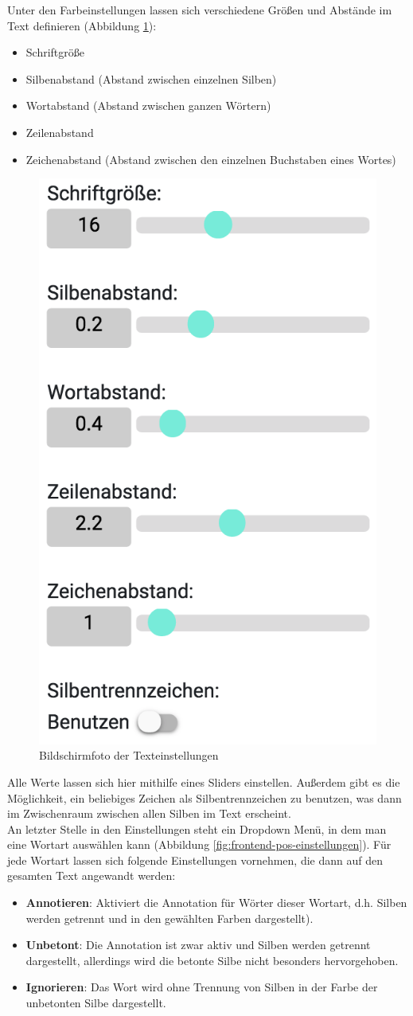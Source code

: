 Unter den Farbeinstellungen lassen sich verschiedene Größen und Abstände im Text definieren (Abbildung \ref{fig:frontend-textconf}):
\begin{itemize}
	\item Schriftgröße
	\item Silbenabstand (Abstand zwischen einzelnen Silben)
	\item Wortabstand (Abstand zwischen ganzen Wörtern)
	\item Zeilenabstand
	\item Zeichenabstand (Abstand zwischen den einzelnen Buchstaben eines Wortes)
\end{itemize}

\begin{figure}[h!]
	\centering
	\includegraphics[width=.4\linewidth, frame]{figures/frontend/config-text}
	\caption{Bildschirmfoto der Texteinstellungen}
	\label{fig:frontend-textconf}
\end{figure}

Alle Werte lassen sich hier mithilfe eines Sliders einstellen. Außerdem gibt es die Möglichkeit, ein beliebiges Zeichen als Silbentrennzeichen zu benutzen, was dann im Zwischenraum zwischen allen Silben im Text erscheint.\\

An letzter Stelle in den Einstellungen steht ein Dropdown Menü, in dem man eine Wortart auswählen kann (Abbildung \ref{fig:frontend-pos-einstellungen}). Für jede Wortart lassen sich folgende Einstellungen vornehmen, die dann auf den gesamten Text angewandt werden:
\begin{itemize}
	\item \textbf{Annotieren}: Aktiviert die Annotation für Wörter dieser Wortart, d.h. Silben werden getrennt und in den gewählten Farben dargestellt).
	
	\item \textbf{Unbetont}: Die Annotation ist zwar aktiv und Silben werden getrennt dargestellt, allerdings wird die betonte Silbe nicht besonders hervorgehoben.
	
	\item \textbf{Ignorieren}: Das Wort wird ohne Trennung von Silben in der Farbe der unbetonten Silbe dargestellt.
\end{itemize}

